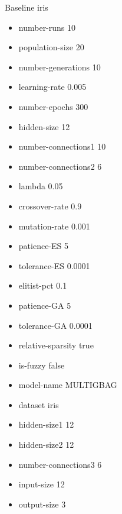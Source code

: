Baseline
iris
\begin{itemize}
\item number-runs 10
\item population-size 20
\item number-generations 10
\item learning-rate 0.005
\item number-epochs 300
\item hidden-size 12
\item number-connections1 10
\item number-connections2 6
\item lambda 0.05
\item crossover-rate 0.9
\item mutation-rate 0.001
\item patience-ES 5
\item tolerance-ES 0.0001
\item elitist-pct 0.1
\item patience-GA 5
\item tolerance-GA 0.0001
\item relative-sparsity true
\item is-fuzzy false
\item model-name MULTIGBAG
\item dataset iris
\item hidden-size1 12
\item hidden-size2 12
\item number-connections3 6
\item input-size 12
\item output-size 3
\end{itemize}

